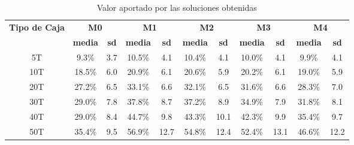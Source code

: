 \begin{table}[H]
    \centering
    \caption{Valor aportado por las soluciones obtenidas}
    \label{tab:valor_aportado}
    \begin{tabular}{|c|c|c|c|c|c|c|c|c|c|c|}
        \hline
        \multirow{2}{*}{\textbf{Tipo de Caja}} & \multicolumn{2}{c|}{\textbf{M0}} & \multicolumn{2}{c|}{\textbf{M1}} & \multicolumn{2}{c|}{\textbf{M2}} & \multicolumn{2}{c|}{\textbf{M3}} & \multicolumn{2}{c|}{\textbf{M4}}                                                                             \\ \cline{2-11}
                                               & \textbf{media}                   & \textbf{sd}                      & \textbf{media}                   & \textbf{sd}                      & \textbf{media}                   & \textbf{sd} & \textbf{media} & \textbf{sd} & \textbf{media} & \textbf{sd} \\ \hline
        5T                                     & 9.3\%                            & 3.7                              & 10.5\%                           & 4.1                              & 10.4\%                           & 4.1         & 10.0\%         & 4.1         & 9.9\%          & 4.1         \\ \hline
        10T                                    & 18.5\%                           & 6.0                              & 20.9\%                           & 6.1                              & 20.6\%                           & 5.9         & 20.2\%         & 6.1         & 19.0\%         & 5.9         \\ \hline
        20T                                    & 27.2\%                           & 6.5                              & 33.1\%                           & 6.6                              & 32.1\%                           & 6.5         & 31.6\%         & 6.6         & 28.3\%         & 7.0         \\ \hline
        30T                                    & 29.0\%                           & 7.8                              & 37.8\%                           & 8.7                              & 37.2\%                           & 8.9         & 34.9\%         & 7.9         & 31.8\%         & 8.1         \\ \hline
        40T                                    & 29.0\%                           & 8.4                              & 44.7\%                           & 9.8                              & 43.3\%                           & 10.1        & 42.3\%         & 9.9         & 35.4\%         & 9.7         \\ \hline
        50T                                    & 35.4\%                           & 9.5                              & 56.9\%                           & 12.7                             & 54.8\%                           & 12.4        & 52.4\%         & 13.1        & 46.6\%         & 12.2        \\ \hline
    \end{tabular}
\end{table}

